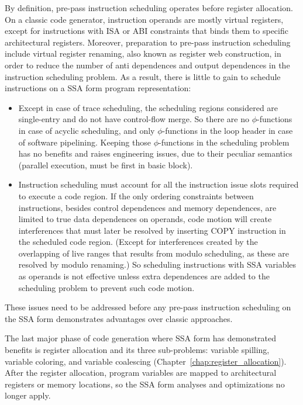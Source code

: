 By definition, pre-pass instruction scheduling operates before register
allocation. On a classic code generator, instruction operands are mostly virtual
registers, except for instructions with ISA or ABI constraints that binds them
to specific architectural registers. Moreover, preparation to pre-pass
instruction scheduling include virtual register renaming, also known as register
web construction, in order to reduce the number of anti dependences and output
dependences in the instruction scheduling problem. As a result, there is little
to gain to schedule instructions on a SSA form program representation:
\begin{itemize}

\item Except in case of trace scheduling, the scheduling regions considered are
single-entry and do not have control-flow merge. So there are no
$\phi$-functions in case of acyclic scheduling, and only $\phi$-functions in the
loop header in case of software pipelining. Keeping those $\phi$-functions in
the scheduling problem has no benefits and raises engineering issues, due to
their peculiar semantics (parallel execution, must be first in basic block).

\item Instruction scheduling must account for all the instruction issue slots
required to execute a code region. If the only ordering constraints between
instructions, besides control dependences and memory dependences, are limited to
true data dependences on operands, code motion will create interferences that
must later be resolved by inserting COPY instruction in the scheduled code
region. (Except for interferences created by the overlapping of live ranges
that results from modulo scheduling, as these are resolved by modulo renaming.)
So scheduling instructions with SSA variables as operands is not effective
unless extra dependences are added to the scheduling problem to prevent such
code motion. 

\end{itemize} These issues need to be addressed before any pre-pass instruction
scheduling on the SSA form demonstrates advantages over classic approaches.

The last major phase of code generation where SSA form has demonstrated benefits
is register allocation and its three sub-problems: variable spilling, variable
coloring, and variable coalescing (Chapter~\ref{chap:register_allocation}). After
the register allocation, program variables are mapped to architectural registers
or memory locations, so the SSA form analyses and optimizations no longer apply.

